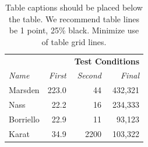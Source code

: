 \documentclass{sigchi-ext}
\begin{document}
\begin{table}
  \centering
  \begin{tabular}{l r r r}
    & & \multicolumn{2}{c}{\small{\textbf{Test Conditions}}} \\
    \cmidrule(r){3-4}
    {\small\textit{Name}}
    & {\small \textit{First}}
      & {\small \textit{Second}}
    & {\small \textit{Final}} \\
    \midrule
    Marsden & 223.0 & 44 & 432,321 \\
    Nass & 22.2 & 16 & 234,333 \\
    Borriello & 22.9 & 11 & 93,123 \\
    Karat & 34.9 & 2200 & 103,322 \\
  \end{tabular}
  \caption{Table captions should be placed below the table. We
    recommend table lines be 1 point, 25\% black. Minimize use of
    table grid lines.}~\label{tab:table1}
\end{table}
\end{document}
